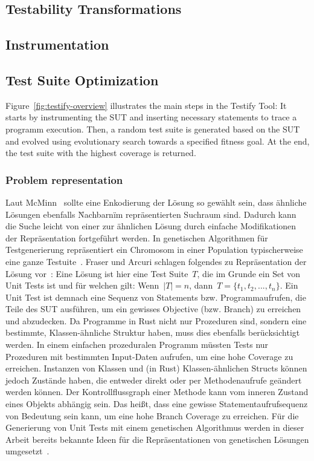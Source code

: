 \documentclass{article}
\begin{document}
\subsection{Testability Transformations}
\subsection{Instrumentation}
\subsection{Test Suite Optimization}
Figure~\cref{fig:testify-overview} illustrates the main steps in the Testify Tool: It starts by instrumenting the \ac{SUT} and inserting necessary statements to trace a programm execution. Then, a random test suite is generated based on the \ac{SUT} and evolved using evolutionary search towards a specified fitness goal. At the end, the test suite with the highest coverage is returned. 

\subsubsection{Problem representation}
Laut McMinn~\cite{McMinn_2004} sollte eine Enkodierung der Lösung so gewählt sein, dass ähnliche Lösungen ebenfalls \"Nachbarn\" im repräsentierten Suchraum sind. Dadurch kann die Suche leicht von einer zur ähnlichen Lösung durch einfache Modifikationen der Repräsentation fortgeführt werden. In genetischen Algorithmen für Testgenerierung repräsentiert ein Chromosom in einer Population typischerweise eine ganze Testuite~\cite{Fraser_2011, Campos2017}. Fraser und Arcuri schlagen folgendes zu Repräsentation der Lösung vor~\cite{Fraser_2011}: Eine Lösung ist hier eine Test Suite~$T$, die im Grunde ein Set von Unit Tests ist und für welchen gilt: Wenn~$|T| = n$, dann~$T = \{t_1, t_2, ... ,t_n\}$. Ein Unit Test ist demnach eine Sequenz von Statements bzw. Programmaufrufen, die Teile des \ac{SUT} ausführen, um ein gewisses Objective (bzw. Branch) zu erreichen und abzudecken. Da Programme in Rust nicht nur Prozeduren sind, sondern eine bestimmte, Klassen-ähnliche Struktur haben, muss dies ebenfalls berücksichtigt werden. In einem einfachen prozeduralen Programm müssten Tests nur Prozeduren mit bestimmten Input-Daten aufrufen, um eine hohe Coverage zu erreichen. Instanzen von Klassen und (in Rust) Klassen-ähnlichen Structs können jedoch Zustände haben, die entweder direkt oder per Methodenaufrufe geändert werden können. Der Kontrollflussgraph einer Methode kann vom inneren Zustand eines Objekts abhängig sein. Das heißt, dass eine gewisse Statementaufrufsequenz von Bedeutung sein kann, um eine hohe Branch Coverage zu erreichen. Für die Generierung von Unit Tests mit einem genetischen Algorithmus werden in dieser Arbeit bereits bekannte Ideen für die Repräsentationen von genetischen Lösungen umgesetzt~\cite{Fraser2012,Tonella2004,Arcuri2008}.
\end{document}
